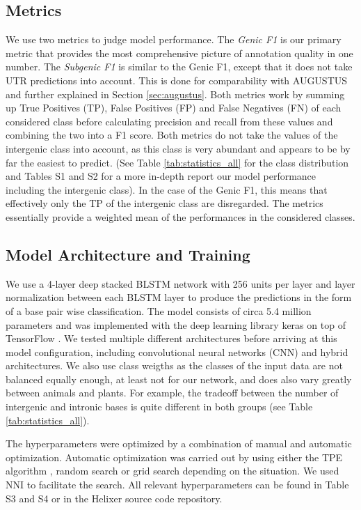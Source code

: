 \documentclass{bioinfo}
\begin{document}
\begin{methods}
\subsection{Metrics}
We use two metrics to judge model performance. The {\it Genic F1} is our primary metric that provides the most comprehensive picture of annotation quality in one number. The {\it Subgenic F1} is similar to the Genic F1, except that it does not take UTR predictions into account. This is done for comparability with AUGUSTUS and further explained in Section \ref{sec:augustus}. Both metrics work by summing up True Positives (TP), False Positives (FP) and False Negatives (FN) of each considered class before calculating precision and recall from these values and combining the two into a F1 score. Both metrics do not take the values of the intergenic class into account, as this class is very abundant and appears to be by far the easiest to predict. (See Table \ref{tab:statistics_all} for the class distribution and Tables S1 and S2 for a more in-depth report our model performance including the intergenic class). In the case of the Genic F1, this means that effectively only the TP of the intergenic class are disregarded. The metrics essentially provide a weighted mean of the performances in the considered classes. 

\subsection{Model Architecture and Training}
\label{sec:model}
We use a 4-layer deep stacked BLSTM network with 256 units per layer and layer normalization \citep{ba2016layer} between each BLSTM layer to produce the predictions in the form of a base pair wise classification. The model consists of circa 5.4 million parameters and was implemented with the deep learning library keras \citep{chollet2015keras} on top of TensorFlow \citep{abadi2016tensorflow}. We tested multiple different architectures before arriving at this model configuration, including convolutional neural networks (CNN) and hybrid architectures. We also use class weigths as the classes of the input data are not balanced equally enough, at least not for our network, and does also vary greatly between animals and plants. For example, the tradeoff between the number of intergenic and intronic bases is quite different in both groups (see Table \ref{tab:statistics_all}). 

The hyperparameters were optimized by a combination of manual and automatic optimization. Automatic optimization was carried out by using either the TPE algorithm \citep{bergstra2011algorithms}, random search or grid search depending on the situation. We used NNI \citep{nni2019} to facilitate the search. All relevant hyperparameters can be found in Table S3 and S4 or in the Helixer source code repository. 
	

\end{methods}
\end{document}

